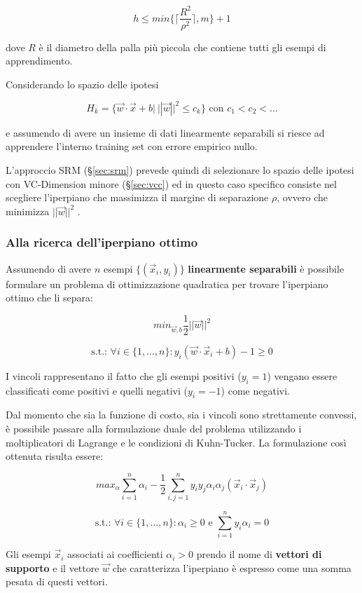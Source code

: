 $$ h \leq min\{\lceil \frac{R^2}{\rho^2}\rceil, m\} +1$$

dove $R$ è il diametro della palla più piccola che contiene tutti gli esempi di apprendimento.

Considerando lo spazio delle ipotesi

$$H_k = \{\vec{w} \cdot \vec{x} + b | \: ||\vec{w}||^2 \leq c_k\} \text{ con } c_1 < c_2 < \ldots$$

e assumendo di avere un insieme di dati linearmente separabili si riesce ad apprendere l'interno training set con errore empirico nullo.

L'approccio SRM (§\ref{sec:srm}) prevede quindi di selezionare lo spazio delle ipotesi con VC-Dimension minore (§\ref{sec:vcc}) ed in questo caso specifico consiste nel scegliere l'iperpiano che massimizza il margine di separazione $\rho$, ovvero che minimizza $||\vec{w}||^2$ .

\subsubsection{Alla ricerca dell'iperpiano ottimo}

Assumendo di avere $n$ esempi $\{(\vec{x}_i, y_i)\}$ \textbf{linearmente separabili} è possibile formulare un problema di ottimizzazione quadratica per trovare l'iperpiano ottimo che li separa:

$$ min_{\vec{w}, b} \frac{1}{2}||\vec{w}||^2 $$

$$ \text{s.t.: } \forall i \in \{1, \ldots , n\} : y_i(\vec{w} \cdot \vec{x}_i + b) - 1 \geq 0 $$

I vincoli rappresentano il fatto che gli esempi positivi ($y_i = 1$) vengano essere classificati come positivi e quelli negativi ($y_i = -1$) come negativi.

Dal momento che sia la funzione di costo, sia i vincoli sono strettamente convessi, è possibile passare alla formulazione duale del problema utilizzando i moltiplicatori di Lagrange e le condizioni di Kuhn-Tucker.
La formulazione così ottenuta risulta essere:

$$max_\alpha \sum\limits_{i=1}^n \alpha_i - \frac{1}{2}\sum\limits_{i,j = 1}^n y_i y_j \alpha_i \alpha_j (\vec{x}_i \cdot \vec{x}_j)$$

$$ \text{s.t.: } \forall i \in \{1, \ldots, n\} : \alpha_i \geq 0 \text{ e } \sum\limits_{i=1}^n y_i \alpha_i = 0$$

Gli esempi $\vec{x}_i$ associati ai coefficienti $\alpha_i > 0$ prendo il nome di \textbf{vettori di supporto} e il vettore $\vec{w}$ che caratterizza l'iperpiano è espresso come una somma pesata di questi vettori.

